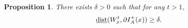 \documentclass[a4paper,11pt]{article}
\theoremstyle{plain}
\newtheorem{prop}[thm]{Proposition}
\theoremstyle{definition}
\numberwithin{equation}{section}
\begin{document}
		

\begin{prop}\label{R(x_t)}
    There exists $\delta>0$ such that for any $t>1$, 
    \begin{equation}\label{w}
        {\rm\underline{dist}}(W_{x}^{t},\partial  I^{+}_{A}(x))\geq\delta.
    \end{equation} 
\end{prop}
    
\end{document}
